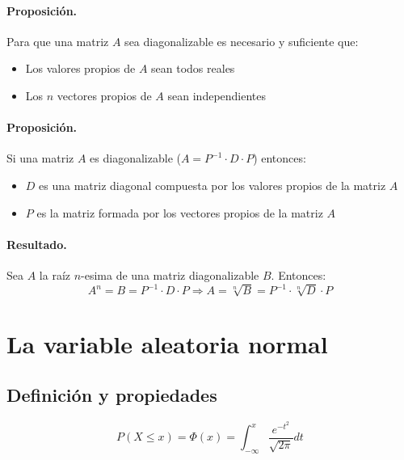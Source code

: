 \paragraph{Proposici\'on.} 
Para que una matriz $A$ sea diagonalizable es necesario y suficiente que:
\begin{itemize}
\item Los valores propios de $A$ sean todos reales
\item Los $n$ vectores propios de $A$ sean independientes
\end{itemize}

\paragraph{Proposici\'on.}
Si una matriz $A$ es diagonalizable ($A = P^{-1} \cdot D \cdot P$) entonces: 
\begin{itemize}
\item $D$ es una matriz diagonal compuesta por los valores propios de la matriz $A$
\item $P$ es la matriz formada por los vectores propios de la matriz $A$
\end{itemize}

\paragraph{Resultado.}
Sea $A$ la ra\'iz $n$-esima de una matriz diagonalizable $B$. Entonces:
\begin{displaymath}
A^n = B = P^{-1} \cdot D \cdot P 
\Longrightarrow  
A = \sqrt[n]{B} = P^{-1} \cdot \sqrt[n]{D} \cdot P
\end{displaymath} 



\section{La variable aleatoria normal}

\subsection{Definici\'on y propiedades}

\begin{displaymath}
P(X \leq x) = \Phi(x) = \int_{-\infty}^{x} \frac{e^{-t^2}}{\sqrt{2 \pi}} dt
\end{displaymath}

